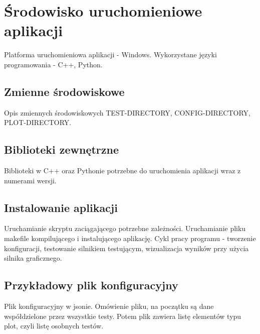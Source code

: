\chapter{Środowisko uruchomieniowe aplikacji}
\thispagestyle{chapterBeginStyle}
Platforma uruchomieniowa aplikacji - Windows. Wykorzystane języki programowania - C++, Python.

\section{Zmienne środowiskowe}
Opis zmiennych środowiskowych TEST-DIRECTORY, CONFIG-DIRECTORY, PLOT-DIRECTORY.


\section{Biblioteki zewnętrzne}
Biblioteki w C++ oraz Pythonie potrzebne do uruchomienia aplikacji wraz z numerami wersji.

\section{Instalowanie aplikacji}
Uruchamianie skryptu zaciągającego potrzebne zależności.
Uruchamianie pliku makefile kompilującego i instalującego aplikację.
Cykl pracy programu - tworzenie konfiguracji, testowanie silnikiem testującym, wizualizacja wyników przy użycia
silnika graficznego.

\section{Przykładowy plik konfiguracyjny}
Plik konfiguracyjny w jsonie. Omówienie pliku, na początku są dane współdzielone przez wszystkie testy.
Potem plik zawiera listę elementów typu plot, czyli listę osobnych testów.
